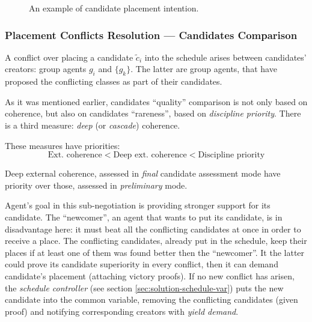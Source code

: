 \documentclass[../../ThesisDoc]{subfiles}
\begin{document}

\begin{figure}[h]
  \centering
  
  \caption{ An example of candidate placement intention. }
  \label{fig:candidate-conflict}
\end{figure}


\subsubsection{Placement Conflicts Resolution --- Candidates Comparison}
\label{sec:solution-compare}

A conflict over placing a candidate $\tilde{c}_i$ into the schedule arises
between candidates' creators: group agents $g_i$ and $\{g_k\}$.
The latter are group agents, that have proposed the conflicting classes
as part of their candidates.

As it was mentioned earlier, candidates ``quality'' comparison is not only based
on coherence, but also on candidates ``rareness'', based on \emph{discipline priority}.
There is a third measure: \emph{deep} (or \emph{cascade}) coherence.

\medskip
\noindent
These measures have priorities:
$$ \text{Ext. coherence} < \text{Deep ext. coherence} < \text{Discipline priority} $$

\medskip
\noindent
Deep external coherence, assessed in \emph{final} candidate assessment mode
have priority over those, assessed in \emph{preliminary} mode.

\bigskip
\noindent
Agent's goal in this sub-negotiation is providing stronger support for its
candidate. The ``newcomer'', an agent that wants to put its candidate, is
in disadvantage here: it must beat all the conflicting candidates at once in
order to receive a place. The conflicting candidates, already put in the schedule,
keep their places if at least one of them was found better then the ``newcomer''.
It the latter could prove its candidate superiority in every conflict, then
it can demand candidate's placement (attaching victory proofs).
If no new conflict has arisen, the \emph{schedule controller}
(see section \ref{sec:solution-schedule-var}) puts the new candidate into the
common variable, removing the conflicting candidates (given proof) and notifying
corresponding creators with \emph{yield demand}.
\end{document}
